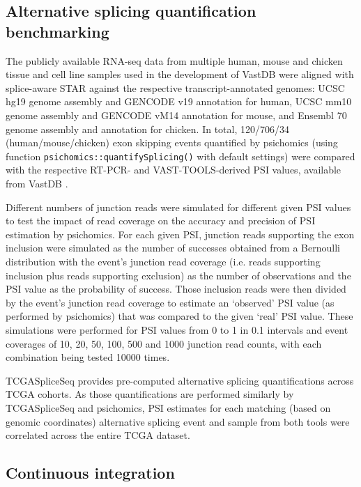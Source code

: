 \subsection{Alternative splicing quantification benchmarking}

The publicly available RNA-seq data from multiple human, mouse and chicken tissue and cell line samples used in the development of VastDB \cite{tapial:2017ui} were aligned with splice-aware STAR \cite{dobin:2013ts} against the respective transcript-annotated genomes: UCSC hg19 genome assembly and GENCODE v19 annotation for human, UCSC mm10 genome assembly and GENCODE vM14 annotation for mouse, and Ensembl 70 genome assembly and annotation for chicken. In total, 120/706/34 (human/mouse/chicken) exon skipping events quantified by psichomics (using function \texttt{psichomics::quantifySplicing()} with default settings) were compared with the respective RT-PCR- and VAST-TOOLS-derived PSI values, available from VastDB \cite{tapial:2017ui}.

Different numbers of junction reads were simulated for different given PSI values to test the impact of read coverage on the accuracy and precision of PSI estimation by psichomics. For each given PSI, junction reads supporting the exon inclusion were simulated as the number of successes obtained from a Bernoulli distribution with the event's junction read coverage (i.e. reads supporting inclusion plus reads supporting exclusion) as the number of observations and the PSI value as the probability of success. Those inclusion reads were then divided by the event's junction read coverage to estimate an ‘observed’ PSI value (as performed by psichomics) that was compared to the given ‘real’ PSI value. These simulations were performed for PSI values from 0 to 1 in 0.1 intervals and event coverages of 10, 20, 50, 100, 500 and 1000 junction read counts, with each combination being tested 10000 times.

TCGASpliceSeq \cite{ryan:2016tm} provides pre-computed alternative splicing quantifications across TCGA cohorts. As those quantifications are performed similarly by TCGASpliceSeq and psichomics, PSI estimates for each matching (based on genomic coordinates) alternative splicing event and sample from both tools were correlated across the entire TCGA dataset.

\subsection{Continuous integration}
\label{subsec:psichomics-ci}

